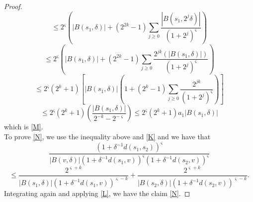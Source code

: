 \documentclass[10pt,a4paper]{amsart}
\begin{document}
\begin{proof}
\begin{equation*}
			\leq 2^{\varsigma}\left(|B(s_1,\delta)|+(2^{2k}-1)\sum_{j\geq 0}\frac{|B(s_1,2^j \delta)|}{(1+2^j)^{\varsigma}}\right)
		\end{equation*}
		\begin{equation*}
			\leq 2^{\varsigma}\left(|B(s_1,\delta)|+(2^{2k}-1)\sum_{j\geq 0}\frac{2^{jk}(|B(s_1,\delta)|)}{(1+2^j)^{\varsigma}}\right)
		\end{equation*}
		\begin{equation*}
			\leq 2^{\varsigma}(2^k +1)\left[|B(s_1,\delta)|\left(1+(2^{k}-1)\sum_{j\geq 0}\frac{2^{jk}}{(1+2^j)^{\varsigma}}\right)\right]
		\end{equation*}
		\begin{equation*}
			\leq 2^{\varsigma}(2^k +1)\left(\frac{|B(s_1,\delta)|}{2^{-k}-2^{-\varsigma}}\right)
			\leq 2^{\varsigma}(2^k+1)a_1|B(s_1,\delta)|
		\end{equation*}
		which is \eqref{M}.\\
		To prove \eqref{N}, we use the inequality above and \eqref{K} and we have that
		\begin{equation*}
			\frac{(1+\delta^{-1} d(s_1,s_2))^{\varsigma}}{|B(v,\delta)|(1+\delta^{-1} d(s_1,v))^{\varsigma} (1+\delta^{-1} d(s_2,v))^{\varsigma}}
		\end{equation*}
		\begin{equation}
			\leq \frac{2^{\varsigma +k}}{|B(s_1,\delta)|(1+\delta^{-1} d(s_1,v))^{\varsigma -k}} + \frac{2^{\varsigma +k}}{|B(s_2,\delta)|(1+\delta^{-1} d(s_2,v))^{\varsigma -k}}.
		\end{equation}
		Integrating again and applying \eqref{L}, we have the claim \eqref{N}.
	\end{proof}
\end{document}
